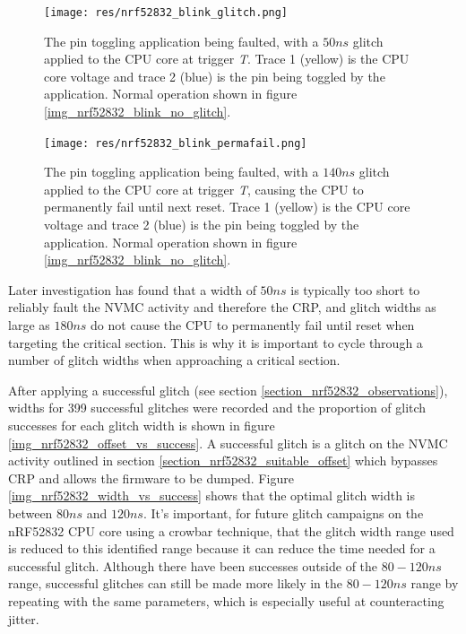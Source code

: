 \begin{figure}
\centering
\texttt{[image: res/nrf52832\_blink\_glitch.png]}
\caption{The pin toggling application being faulted, with a \(50ns\)
glitch applied to the CPU core at trigger \emph{T}. Trace 1 (yellow) is
the CPU core voltage and trace 2 (blue) is the pin being toggled by the
application. Normal operation shown in figure
\ref{img_nrf52832_blink_no_glitch}.\label{img_nrf52832_blink_glitch}}
\end{figure}

\begin{figure}
\centering
\texttt{[image: res/nrf52832\_blink\_permafail.png]}
\caption{The pin toggling application being faulted, with a \(140ns\)
glitch applied to the CPU core at trigger \emph{T}, causing the CPU to
permanently fail until next reset. Trace 1 (yellow) is the CPU core
voltage and trace 2 (blue) is the pin being toggled by the application.
Normal operation shown in figure
\ref{img_nrf52832_blink_no_glitch}.\label{img_nrf52832_blink_permafail}}
\end{figure}

Later investigation has found that a width of \(50ns\) is typically too
short to reliably fault the NVMC activity and therefore the CRP, and
glitch widths as large as \(180ns\) do not cause the CPU to permanently
fail until reset when targeting the critical section. This is why it is
important to cycle through a number of glitch widths when approaching a
critical section.

After applying a successful glitch (see section
\ref{section_nrf52832_observations}), widths for 399 successful glitches
were recorded and the proportion of glitch successes for each glitch
width is shown in figure \ref{img_nrf52832_offset_vs_success}. A
successful glitch is a glitch on the NVMC activity outlined in section
\ref{section_nrf52832_suitable_offset} which bypasses CRP and allows the
firmware to be dumped. Figure \ref{img_nrf52832_width_vs_success} shows
that the optimal glitch width is between \(80ns\) and \(120ns\). It's
important, for future glitch campaigns on the nRF52832 CPU core using a
crowbar technique, that the glitch width range used is reduced to this
identified range because it can reduce the time needed for a successful
glitch. Although there have been successes outside of the \(80-120ns\)
range, successful glitches can still be made more likely in the
\(80-120ns\) range by repeating with the same parameters, which is
especially useful at counteracting jitter.

